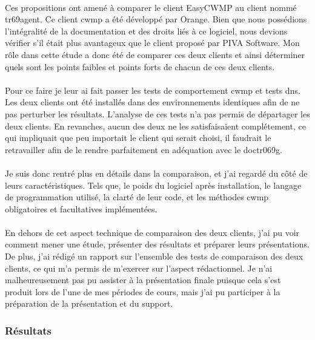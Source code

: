 \documentclass[12pt,a4paper]{report}
\begin{document}
\paragraph*{}Ces propositions ont amené à comparer le client EasyCWMP au client nommé tr69agent. Ce client \gls{cwmp} a été développé par Orange. Bien que nous possédions l’intégralité de la documentation et des droits liés à ce logiciel, nous devions vérifier s’il était plus avantageux que le client proposé par PIVA Software. Mon rôle dans cette étude a donc été de comparer ces deux clients et ainsi déterminer quels sont les points faibles et points forts de chacun de ces deux clients.
\paragraph*{}Pour ce faire je leur ai fait passer les tests de comportement \gls{cwmp} et tests \gls{dns}. Les deux clients ont été installés dans des environnements identiques afin de ne pas perturber les résultats. L’analyse de ces tests n’a pas permis de départager les deux clients. En revanches, aucun des deux ne les satisfaisaient complétement, ce qui impliquait que peu importait le client qui serait choisi, il faudrait le retravailler afin de le rendre parfaitement en adéquation avec le \gls{doctr069g}.
\paragraph*{} Je suis donc rentré plus en détails dans la comparaison, et j’ai regardé du côté de leurs caractéristiques. Tels que, le poids du logiciel après installation, le langage de programmation utilisé, la clarté de leur code, et les méthodes \gls{cwmp} obligatoires et facultatives implémentées.
\paragraph*{}En dehors de cet aspect technique de comparaison des deux clients, j’ai pu voir comment mener une étude, présenter des résultats et préparer leurs présentations. De plus, j’ai rédigé un rapport sur l’ensemble des tests de comparaison des deux clients, ce qui m’a permis de m’exercer sur l’aspect rédactionnel. Je n’ai malheureusement pas pu assister à la présentation finale puisque cela s’est produit lors de l’une de mes périodes de cours, mais j'ai pu participer à la préparation de la présentation et du support. \\
\subsubsection{Résultats}
\end{document}
